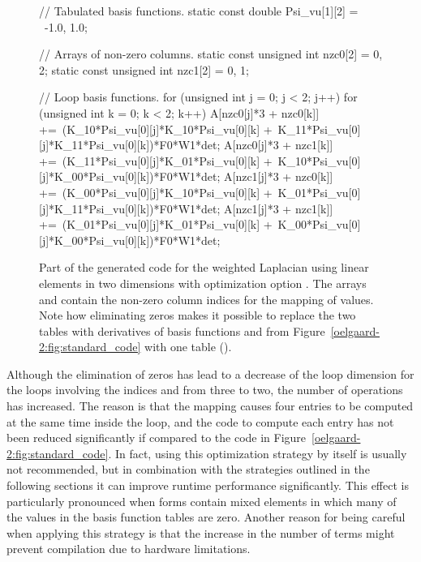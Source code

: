 \begin{figure}
\begin{c++}
// Tabulated basis functions.
static const double Psi_vu[1][2] = \
{{-1.0, 1.0}};

// Arrays of non-zero columns.
static const unsigned int nzc0[2] = {0, 2};
static const unsigned int nzc1[2] = {0, 1};

// Loop basis functions.
for (unsigned int j = 0; j < 2; j++)
{
 for (unsigned int k = 0; k < 2; k++)
 {
  A[nzc0[j]*3 + nzc0[k]] +=\
   (K_10*Psi_vu[0][j]*K_10*Psi_vu[0][k] +\
    K_11*Psi_vu[0][j]*K_11*Psi_vu[0][k])*F0*W1*det;
  A[nzc0[j]*3 + nzc1[k]] +=\
   (K_11*Psi_vu[0][j]*K_01*Psi_vu[0][k] +\
    K_10*Psi_vu[0][j]*K_00*Psi_vu[0][k])*F0*W1*det;
  A[nzc1[j]*3 + nzc0[k]] +=\
   (K_00*Psi_vu[0][j]*K_10*Psi_vu[0][k] +\
    K_01*Psi_vu[0][j]*K_11*Psi_vu[0][k])*F0*W1*det;
  A[nzc1[j]*3 + nzc1[k]] +=\
   (K_01*Psi_vu[0][j]*K_01*Psi_vu[0][k] +\
    K_00*Psi_vu[0][j]*K_00*Psi_vu[0][k])*F0*W1*det;
 }
}
\end{c++}
\caption{Part of the generated code for the weighted Laplacian using
  linear elements in two dimensions with optimization option \emp{-f
    eliminate\_zeros}.  The arrays \emp{nzc0} and  contain the
  non-zero column indices for the mapping of values.  Note how
  eliminating zeros makes it possible to replace the two tables with
  derivatives of basis functions \emp{Psi\_vu\_D01} and
   from Figure~\ref{oelgaard-2:fig:standard_code} with
  one table ().}
\label{oelgaard-2:fig:O_zeros_code}
\end{figure}

Although the elimination of zeros has lead to a decrease of the loop
dimension for the loops involving the indices \emp{j} and  from
three to two, the number of operations has increased.  The reason is
that the mapping causes four entries to be computed at the same time
inside the loop, and the code to compute each entry has not been
reduced significantly if compared to the code in
Figure~\ref{oelgaard-2:fig:standard_code}.  In fact, using this
optimization strategy by itself is usually not recommended, but in
combination with the strategies outlined in the following sections it
can improve runtime performance significantly.  This effect is
particularly pronounced when forms contain mixed elements in which
many of the values in the basis function tables are zero.  Another
reason for being careful when applying this strategy is that the
increase in the number of terms might prevent \ffc{} compilation due
to hardware limitations.

